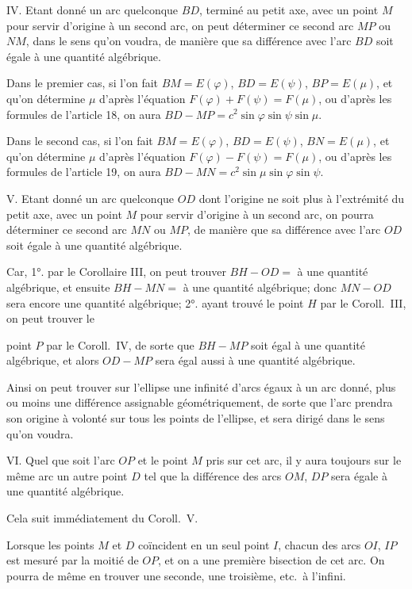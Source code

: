 \documentclass{article}
\begin{document}
IV. Etant donné un arc quelconque $BD$, terminé au petit axe, avec un point $M$ pour servir d'origine à un second arc, on peut déterminer ce second arc $MP$ ou $NM$, dans le sens qu'on voudra, de manière que sa différence avec l'arc $BD$ soit égale à une quantité algébrique.

Dans le premier cas, si l'on fait $BM=E(\varphi)$, $BD=E(\psi)$, $BP=E(\mu)$, et qu'on détermine $\mu$ d'après l'équation $F(\varphi)+F(\psi)=F(\mu)$, ou d'après les formules de l'article 18, on aura $BD-MP=c^{2}\sin\varphi\sin\psi\sin\mu$.

Dans le second cas, si l'on fait $BM=E(\varphi)$, $BD=E(\psi)$, $BN=E(\mu)$, et qu'on détermine $\mu$ d'après l'équation $F(\varphi)-F(\psi)=F(\mu)$, ou d'après les formules de l'article 19, on aura $BD-MN=c^{2}\sin\mu\sin\varphi\sin\psi$.


V. Etant donné un arc quelconque $OD$ dont l'origine ne soit plus à l'extrémité du petit axe, avec un point $M$ pour servir d'origine à un second arc, on pourra déterminer ce second arc $MN$ ou $MP$, de manière que sa différence avec l'arc $OD$ soit égale à une quantité algébrique.

Car, 1°. par le Corollaire III, on peut trouver $BH-OD=$ à une quantité algébrique, et ensuite $BH-MN=$ à une quantité algébrique; donc $MN-OD$ sera encore une quantité algébrique; 2°. ayant trouvé le point $H$ par le Coroll.\ III, on peut trouver le

point $P$ par le Coroll.\ IV, de sorte que $BH-MP$ soit égal à une quantité algébrique, et alors $OD-MP$ sera égal aussi à une quantité algébrique.

Ainsi on peut trouver sur l'ellipse une infinité d'arcs égaux à un arc donné, plus ou moins une différence assignable géométriquement, de sorte que l'arc prendra son origine à volonté sur tous les points de l'ellipse, et sera dirigé dans le sens qu'on voudra.

VI. Quel que soit l'arc $OP$ et le point $M$ pris sur cet arc, il y aura toujours sur le même arc un autre point $D$ tel que la différence des arcs $OM$, $DP$ sera égale à une quantité algébrique.

Cela suit immédiatement du Coroll.\ V.

Lorsque les points $M$ et $D$ coïncident en un seul point $I$, chacun des arcs $OI$, $IP$ est mesuré par la moitié de $OP$, et on a une première bisection de cet arc. On pourra de même en trouver une seconde, une troisième, etc.\ à l'infini.
\end{document}
